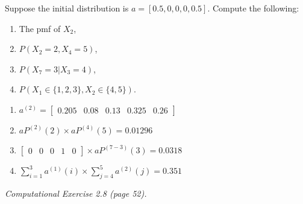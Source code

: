 \documentclass[answers]{exam}
\begin{document}
\begin{questions}
Suppose the initial distribution is \(a = [0.5, 0, 0, 0, 0.5]\). Compute the following:
\begin{enumerate}[1.]
	\item The pmf of \(X_2\),
	\item \(P(X_2 = 2, X_4 = 5)\),
	\item \(P(X_7 = 3|X_3 = 4)\),
	\item \(P(X_1 \in \{1,2,3\},X_2 \in \{4,5\})\).
\end{enumerate}
\begin{solution}
	\begin{enumerate}[1.]
		\item \(a^{(2)} = \begin{bmatrix} 0.205 & 0.08 & 0.13 & 0.325 & 0.26 \end{bmatrix}\)
		\item \(aP^{(2)}(2) \times aP^{(4)}(5) = 0.01296\) 
		\item \( \begin{bmatrix} 0 & 0 & 0 & 1 & 0 \end{bmatrix} \times aP^{(7-3)}(3) = 0.0318 \)
		\item \(\sum_{i=1}^{3} a^{(1)}(i) \times \sum_{j=4}^{5} a^{(2)}(j) = 0.351\)
	\end{enumerate}
\end{solution}

\question 
\textit{Computational Exercise 2.8 (page 52).}


\end{questions}
\end{document}
